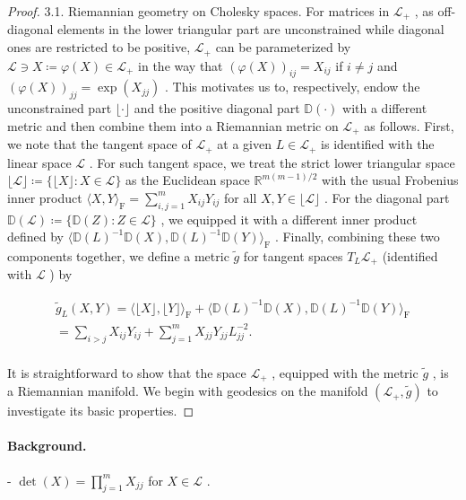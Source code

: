 \documentclass[11pt]{article}
\begin{document}
\begin{proof}
3.1. Riemannian geometry on Cholesky spaces. For matrices in  $\mathcal{L}_{+}$ , as off-diagonal elements in the lower triangular part are unconstrained while diagonal ones are restricted to be positive,  $\mathcal{L}_{+}$  can be parameterized by  $\mathcal{L} \ni X \coloneqq \varphi(X) \in \mathcal{L}_{+}$  in the way that  $(\varphi(X))_{ij} = X_{ij}$  if  $i \neq j$  and  $(\varphi(X))_{jj} = \exp(X_{jj})$ . This motivates us to, respectively, endow the unconstrained part  $\lfloor \cdot \rfloor$  and the positive diagonal part  $\mathbb{D}(\cdot)$  with a different metric and then combine them into a Riemannian metric on  $\mathcal{L}_{+}$  as follows. First, we note that the tangent space of  $\mathcal{L}_{+}$  at a given  $L \in \mathcal{L}_{+}$  is identified with the linear space  $\mathcal{L}$ . For such tangent space, we treat the strict lower triangular space  $\lfloor \mathcal{L} \rfloor \coloneqq \{\lfloor X \rfloor : X \in \mathcal{L}\}$  as the Euclidean space  $\mathbb{R}^{m(m-1)/2}$  with the usual Frobenius inner product  $\langle X, Y \rangle_{\mathrm{F}} = \sum_{i,j=1}^{m} X_{ij} Y_{ij}$  for all  $X, Y \in \lfloor \mathcal{L} \rfloor$ . For the diagonal part  $\mathbb{D}(\mathcal{L}) \coloneqq \{\mathbb{D}(Z) : Z \in \mathcal{L}\}$ , we equipped it with a different inner product defined by  $\langle \mathbb{D}(L)^{-1} \mathbb{D}(X), \mathbb{D}(L)^{-1} \mathbb{D}(Y) \rangle_{\mathrm{F}}$ . Finally, combining these two components together, we define a metric  $\tilde{g}$  for tangent spaces  $T_L \mathcal{L}_{+}$  (identified with  $\mathcal{L}$ ) by

$$
\begin{array}{l} \tilde {g} _ {L} (X, Y) = \langle \lfloor X \rfloor , \lfloor Y \rfloor \rangle_ {\mathrm {F}} + \langle \mathbb {D} (L) ^ {- 1} \mathbb {D} (X), \mathbb {D} (L) ^ {- 1} \mathbb {D} (Y) \rangle_ {\mathrm {F}} \\ = \sum_ {i > j} X _ {i j} Y _ {i j} + \sum_ {j = 1} ^ {m} X _ {j j} Y _ {j j} L _ {j j} ^ {- 2}. \\ \end{array}
$$

It is straightforward to show that the space  $\mathcal{L}_{+}$ , equipped with the metric  $\tilde{g}$ , is a Riemannian manifold. We begin with geodesics on the manifold  $(\mathcal{L}_{+},\tilde{g})$  to investigate its basic properties.

\end{proof}

\paragraph{Background.}
-  $\operatorname{det}(X) = \prod_{j=1}^{m} X_{jj}$  for  $X \in \mathcal{L}$ .
\end{document}
